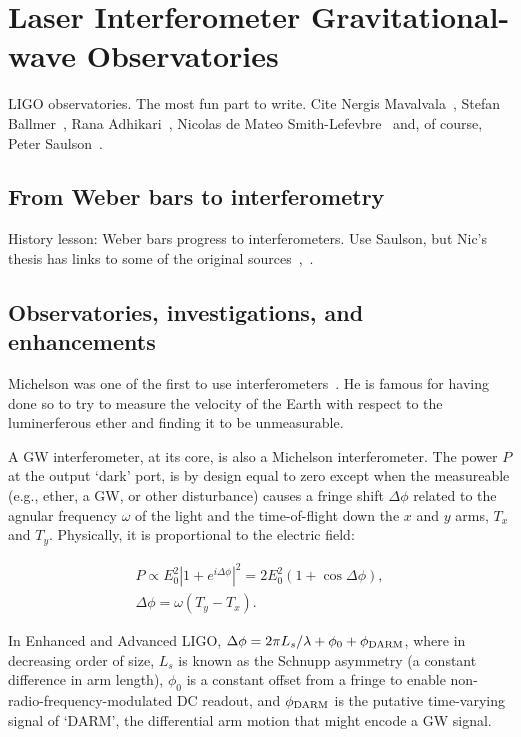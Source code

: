     \section{Laser Interferometer Gravitational-wave Observatories}
    \label{LIGO}
        
        LIGO observatories. The most fun part to write. Cite Nergis Mavalvala~\cite{MavalvalaThesis}, Stefan Ballmer~\cite{BallmerThesis}, Rana Adhikari~\cite{AdhikariThesis}, Nicolas de Mateo Smith-Lefevbre~\cite{SmithThesis} and, of course, Peter Saulson~\cite{Saulson}.

        \subsection{From Weber bars to interferometry}
        \label{bars_to_interferometry}

            History lesson: Weber bars progress to interferometers. Use Saulson, but Nic's thesis has links to some of the original sources~\cite{Saulson},~\cite{SmithThesis}.           

        \subsection{Observatories, investigations, and enhancements}
        \label{methods}

		Michelson was one of the first to use interferometers~\cite{michelson}. He is famous for having done so to try to measure the velocity of the Earth with respect to the luminerferous ether and finding it to be unmeasurable.

A GW interferometer, at its core, is also a Michelson interferometer. 
The power $P$ at the output `dark' port, is by design equal to zero except when the measureable (e.g., ether, a GW, or other disturbance) causes a fringe shift $\Delta \phi$ related to the agnular frequency $\omega$ of the light and the time-of-flight down the $x$ and $y$ arms, $T_x$ and $T_y$. 
Physically, it is proportional to the electric field: 

\begin{eqnarray}
P \propto E_0^2 \left| 1 + e^{i \Delta \phi}\right|^2 = 2 E_0^2 (1 + \cos \Delta \phi), \\
\Delta \phi = \omega (T_y - T_x).
\end{eqnarray}

In Enhanced and Advanced LIGO, $\Delta \phi = 2\pi L_s /\lambda + \phi_0 + \phi_{\textup{DARM}} $, where in decreasing order of size, $L_s$ is known as the Schnupp asymmetry (a constant difference in arm length), $\phi_0$ is a constant offset from a fringe to enable non-radio-frequency-modulated DC readout, and $\phi_{\textup{DARM}}$ is the putative time-varying signal of `DARM', the differential arm motion that might encode a GW signal. 

